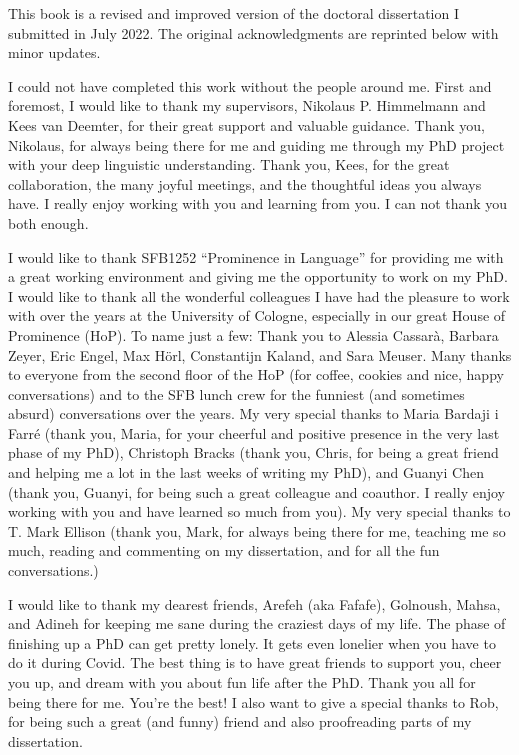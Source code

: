 \addchap{\lsAcknowledgementTitle} 

This book is a revised and improved version of the doctoral dissertation I submitted in July 2022. The original acknowledgments are reprinted below with minor updates.

I could not have completed this work without the people around me. First and foremost, I would like to thank my supervisors, Nikolaus P. Himmelmann and Kees van Deemter, for their great support and valuable guidance. Thank you, Nikolaus, for always being there for me and guiding me through my PhD project with your deep linguistic understanding. Thank you, Kees, for the great collaboration, the many joyful meetings, and the thoughtful ideas you always have. I really enjoy working with you and learning from you. I can not thank you both enough.

I would like to thank SFB1252 “Prominence in Language” for providing me with a great working environment and giving me the opportunity to work on my PhD. I would like to thank all the wonderful colleagues I have had the pleasure to work with over the years at the University of Cologne, especially in our great House of Prominence (HoP). To name just a few: Thank you to Alessia Cassarà, Barbara Zeyer, Eric Engel, Max Hörl, Constantijn Kaland, and Sara Meuser. Many thanks to everyone from the second floor of the HoP (for coffee, cookies and nice, happy conversations) and to the SFB lunch crew for the funniest (and sometimes absurd) conversations over the years. My very special thanks to Maria Bardaji i Farré (thank you, Maria, for your cheerful and positive presence in the very last phase of my PhD), Christoph Bracks (thank you, Chris, for being a great friend and helping me a lot in the last weeks of writing my PhD), and Guanyi Chen (thank you, Guanyi, for being such a great colleague and coauthor. I really enjoy working with you and have learned so much from you). My very special thanks to T. Mark Ellison (thank you, Mark, for always being there for me, teaching me so much, reading and commenting on my dissertation, and for all the fun conversations.)

I would like to thank my dearest friends, Arefeh (aka Fafafe), Golnoush, Mahsa, and Adineh for keeping me sane during the craziest days of my life. The phase of finishing up a PhD can get pretty lonely. It gets even lonelier when you have to do it during Covid. The best thing is to have great friends to support you, cheer you up, and dream with you about fun life after the PhD. Thank you all for being there for me. You're the best! I also want to give a special thanks to Rob, for being such a great (and funny) friend and also proofreading parts of my dissertation.

